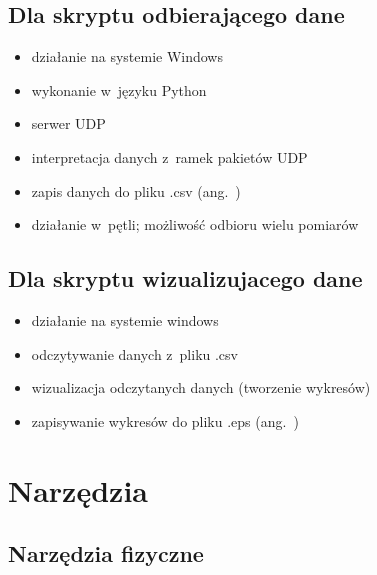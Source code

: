 \subsection*{Dla skryptu odbierającego dane}
\begin{itemize}
    \item działanie na systemie Windows
    \item wykonanie w~języku Python
    \item serwer UDP
    \item interpretacja danych z~ramek pakietów UDP
    \item zapis danych do pliku .csv (ang.~)
    \item działanie w~pętli; możliwość odbioru wielu pomiarów
\end{itemize}

\subsection*{Dla skryptu wizualizujacego dane}
\begin{itemize}
    \item działanie na systemie windows
    \item odczytywanie danych z~pliku .csv
    \item wizualizacja odczytanych danych (tworzenie wykresów)
    \item zapisywanie wykresów do pliku .eps (ang.~)
\end{itemize}

\newpage

\section{Narzędzia}
\label{ch:narzedzia}
\subsection*{Narzędzia fizyczne}

